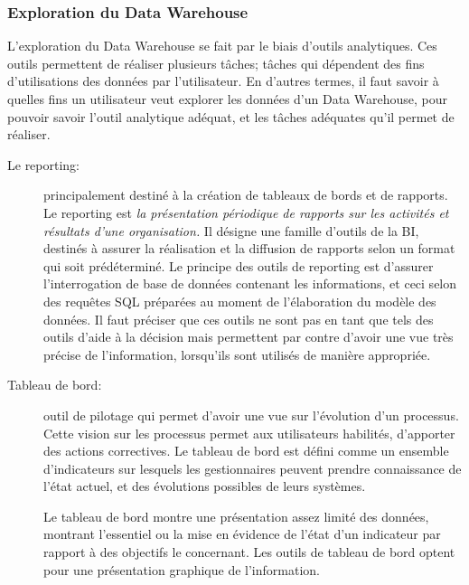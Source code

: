 \documentclass[12pt,a4wide,twoside]{report}
\begin{document}
\subsubsection{Exploration du Data Warehouse }
L'exploration du Data Warehouse se fait par le biais d'outils analytiques. Ces outils permettent de réaliser plusieurs tâches; tâches qui dépendent des fins d'utilisations des données par l'utilisateur. En d'autres termes, il faut savoir à quelles fins un utilisateur veut explorer les données d'un Data Warehouse, pour pouvoir savoir l'outil analytique adéquat, et les tâches adéquates qu'il permet de réaliser.
\begin{description}
\item[Le reporting: ] principalement destiné à la création de tableaux de bords et de rapports.\newline
Le reporting est \emph{la présentation périodique de rapports sur les activités et résultats d'une organisation.}\cite{misc10} Il désigne une famille d'outils de la BI, destinés à assurer la réalisation et la diffusion de rapports selon un format qui soit prédéterminé.\newline
Le principe des outils de reporting est d'assurer l'interrogation de base de données contenant les informations, et ceci selon des requêtes SQL préparées au moment de l'élaboration du modèle des données.\newline
Il faut préciser que ces outils ne sont pas en tant que tels des outils d'aide à la décision mais permettent par contre d'avoir une vue très précise de l'information, lorsqu'ils sont utilisés de manière appropriée.

\item[Tableau de bord: ]outil de pilotage qui permet d'avoir une vue sur l'évolution d'un processus. Cette vision sur les processus permet aux utilisateurs habilités, d'apporter des actions correctives.\newline
Le tableau de bord est défini comme un ensemble d'indicateurs sur lesquels les gestionnaires peuvent prendre connaissance de l'état actuel, et des évolutions possibles de leurs systèmes.


Le tableau de bord montre une présentation assez limité des données, montrant l'essentiel ou la mise en évidence de l'état d'un indicateur par rapport à des objectifs le concernant. Les outils de tableau de bord optent pour une présentation graphique de l'information.


\end{description}
\end{document}
